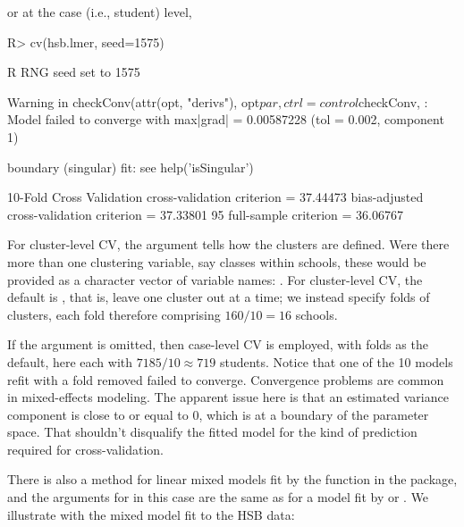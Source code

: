 \documentclass[
]{jss}
\begin{document}
or at the case (i.e., student) level,

\begin{CodeChunk}
\begin{CodeInput}
R> cv(hsb.lmer, seed=1575)
\end{CodeInput}
\begin{CodeOutput}
R RNG seed set to 1575
\end{CodeOutput}
\begin{CodeOutput}
Warning in checkConv(attr(opt, "derivs"), opt$par, ctrl = control$checkConv, :
Model failed to converge with max|grad| = 0.00587228 (tol = 0.002, component 1)
\end{CodeOutput}
\begin{CodeOutput}
boundary (singular) fit: see help('isSingular')
\end{CodeOutput}
\begin{CodeOutput}
10-Fold Cross Validation
cross-validation criterion = 37.44473
bias-adjusted cross-validation criterion = 37.33801
95%
full-sample criterion = 36.06767 
\end{CodeOutput}
\end{CodeChunk}

For cluster-level CV, the  argument tells
 how the clusters are defined. Were there more than one
clustering variable, say classes within schools, these would be provided
as a character vector of variable names:
. For cluster-level CV,
the default is , that is, leave one cluster out at a
time; we instead specify  folds of clusters, each fold
therefore comprising \(160/10 = 16\) schools.

If the  argument is omitted, then case-level CV
is employed, with  folds as the default, here each with
\(7185/10 \approx 719\) students. Notice that one of the 10 models refit
with a fold removed failed to converge. Convergence problems are common
in mixed-effects modeling. The apparent issue here is that an estimated
variance component is close to or equal to 0, which is at a boundary of
the parameter space. That shouldn't disqualify the fitted model for the
kind of prediction required for cross-validation.

There is also a  method for linear mixed models fit by the
 function in the  package, and the arguments for
 in this case are the same as for a model fit by
 or . We illustrate with the mixed model fit
to the HSB data:
\end{document}
